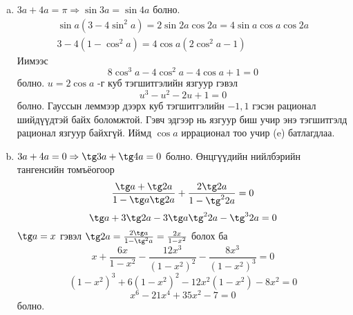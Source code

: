 \documentclass[10pt,a4paper,oneside]{book}
\begin{document}
\begin{enumerate}[(a)]
\item
$3a + 4a = \pi \Rightarrow \sin 3a = \sin 4a$  болно. 
\begin{align*}
\sin a(3-4\sin^2 a) = 2\sin 2a \cos 2a = 4\sin a \cos a \cos 2a\\
3 - 4(1-\cos^2 a) = 4\cos a (2\cos^2 a - 1)
\end{align*}
Иимээс
\begin{equation}
8\cos^3 a - 4\cos^2 a - 4\cos a + 1 = 0
\end{equation}
болно. $u=2\cos a$ -г куб тэгшитгэлийн язгуур гэвэл
\begin{equation*}
u^3-u^2-2u + 1=0
\end{equation*}
болно. Гауссын леммээр дээрх куб тэгшитгэлийн $-1, 1$ гэсэн рационал шийдүүдтэй байх боломжтой. Гэвч эдгээр нь язгуур биш учир энэ тэгшитгэлд рационал язгуур байхгүй. Иймд $\cos a$ иррационал тоо учир (e) батлагдлаа.


\item
$3a + 4a = 0 \Rightarrow \tg 3a + \tg 4a = 0$ болно. Өнцгүүдийн нийлбэрийн тангенсийн томъёогоор
\begin{equation*}
\frac{\tg a + \tg 2a}{1-\tg a\tg 2a} + \frac{2\tg 2a}{1-\tg^2 2a} = 0
\end{equation*}
\begin{equation*}
\tg a + 3\tg 2a -3\tg a\tg^2 2a - \tg^3 2a = 0
\end{equation*}
$\tg a = x$ гэвэл $\tg 2a = \frac{2\tg a}{1-\tg^2 a} = \frac{2x}{1-x^2}$ болох ба
\begin{equation*}
x + \frac{6x}{1-x^2} - \frac{12 x^3}{(1-x^2)^2} - \frac{8x^3}{(1-x^2)^3} = 0
\end{equation*}
\begin{equation*}
(1-x^2)^3 + 6(1-x^2)^2 - 12x^2(1-x^2) - 8x^2 = 0
\end{equation*}
\begin{equation*}
x^6 - 21x^4 + 35x^2 - 7 = 0
\end{equation*}
болно.

\end{enumerate}
\end{document}
